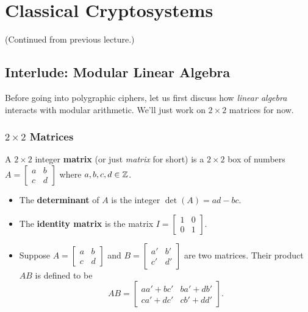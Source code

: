 \documentclass[letterpaper]{article}
\begin{document}
\section{Classical Cryptosystems}
(Continued from previous lecture.)

\subsection{Interlude: Modular Linear Algebra}
Before going into polygraphic ciphers, let us first discuss how \emph{linear algebra} interacts with modular arithmetic. We'll just work on $2 \times 2$ matrices for now.

\subsubsection{\texorpdfstring{$2 \times 2$ Matrices}{2 by 2 Matrices}}

\begin{definition}{}{}
    A $2 \times 2$ integer \textbf{matrix} (or just \emph{matrix} for short) is a $2 \times 2$ box of numbers $A = \begin{bmatrix}
        a & b \\ c & d
    \end{bmatrix}$ where $a, b, c, d \in \mathbb{Z}$. 
    \begin{itemize}
        \item The \textbf{determinant} of $A$ is the integer $\det(A) = ad - bc$. 
        \item The \textbf{identity matrix} is the matrix $I = \begin{bmatrix}
            1 & 0 \\ 0 & 1
        \end{bmatrix}$. 
        \item Suppose $A = \begin{bmatrix}
            a & b \\ c & d
        \end{bmatrix}$ and $B = \begin{bmatrix}
            a' & b' \\ c' & d'
        \end{bmatrix}$ are two matrices. Their product $AB$ is defined to be \[AB = \begin{bmatrix}
            aa' + bc' & ba' + db' \\ ca' + dc' & cb' + dd'
        \end{bmatrix}.\]
    \end{itemize}
\end{definition}
\end{document}
